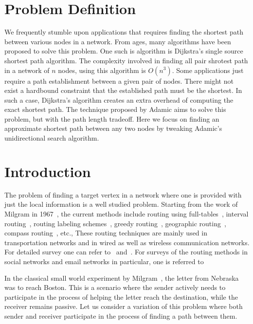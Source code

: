 \documentclass[a4paper,12pt]{article}
\begin{document}
\newpage
\section{Problem Definition}
We frequently stumble upon applications that requires finding the shortest path between various nodes in a network. From ages, many algorithms have been proposed to solve this problem. One such is algorithm is Dijkstra's single source shortest path algorithm. The complexity involved in finding all pair shrotest path in a network of $n$ nodes, using this algorithm is $O(n^3)$. Some applications just require a path establishment between a given pair of nodes. There might not exist a hardbound constraint that the established path must be the shortest. In such a case, Dijkstra's algorithm creates an extra overhead of computing the exact shortest path. The technique proposed by Adamic aims to solve this problem, but with the path length tradeoff. Here we focus on finding an approximate shortest path between any two nodes by tweaking Adamic's unidirectional search algorithm.

\section{Introduction}
The problem of finding a target vertex in a network where one is provided with just the local information is a well studied problem. Starting from the work of Milgram in 1967~\cite{milgram67}, the current methods include routing using full-tables~\cite{gavoille01}, interval routing~\cite{gavoille99,gavoille01}, routing labeling schemes~\cite{peleg00,thorup01}, greedy routing~\cite{giordano01,kleinberg-1-00}, geographic routing~\cite{giordano01}, compass routing~\cite{giordano01}, 
etc., These routing techniques are mainly used in transportation networks and in wired as well as wireless communication networks. For detailed survey one can refer to~\cite{gavoille99, gavoille01, giordano01} and~\cite{peleg00}. For surveys of the routing methods in social networks and email networks in particular, one is referred to~\cite{adamic02, adamic01, fraigniaud07, kleinberg-1-00, nowell05} 


%
 
In the classical small world experiment by Milgram~\cite{milgram67}, the letter from Nebraska was to reach Boston. This is a scenario where the sender actively needs to participate in the process of helping the letter reach the destination, while the receiver remains passive. Let us consider a variation of this problem where both sender and receiver participate in the process of finding a path between them. 
\end{document}

